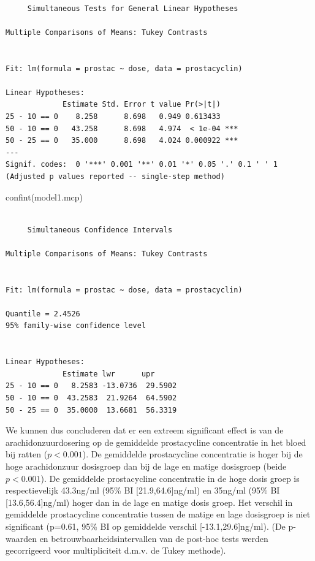 \documentclass[
  dutch,
  letterpaper,
  12pt]{book}
\newenvironment{Shaded}{\begin{snugshade}}{\end{snugshade}}
\newcommand{\FunctionTok}[1]{\textcolor[rgb]{0.28,0.35,0.67}{#1}}
\newcommand{\NormalTok}[1]{\textcolor[rgb]{0.00,0.23,0.31}{#1}}
\theoremstyle{definition}
\theoremstyle{definition}
\theoremstyle{definition}
\theoremstyle{remark}
\begin{document}
\begin{verbatim}

     Simultaneous Tests for General Linear Hypotheses

Multiple Comparisons of Means: Tukey Contrasts


Fit: lm(formula = prostac ~ dose, data = prostacyclin)

Linear Hypotheses:
             Estimate Std. Error t value Pr(>|t|)    
25 - 10 == 0    8.258      8.698   0.949 0.613433    
50 - 10 == 0   43.258      8.698   4.974  < 1e-04 ***
50 - 25 == 0   35.000      8.698   4.024 0.000922 ***
---
Signif. codes:  0 '***' 0.001 '**' 0.01 '*' 0.05 '.' 0.1 ' ' 1
(Adjusted p values reported -- single-step method)
\end{verbatim}

\begin{Shaded}
\begin{Highlighting}[]
\FunctionTok{confint}\NormalTok{(model1.mcp)}
\end{Highlighting}
\end{Shaded}

\begin{verbatim}

     Simultaneous Confidence Intervals

Multiple Comparisons of Means: Tukey Contrasts


Fit: lm(formula = prostac ~ dose, data = prostacyclin)

Quantile = 2.4526
95% family-wise confidence level
 

Linear Hypotheses:
             Estimate lwr      upr     
25 - 10 == 0   8.2583 -13.0736  29.5902
50 - 10 == 0  43.2583  21.9264  64.5902
50 - 25 == 0  35.0000  13.6681  56.3319
\end{verbatim}

We kunnen dus concluderen dat er een extreem significant effect is van
de arachidonzuurdosering op de gemiddelde prostacycline concentratie in
het bloed bij ratten (\(p<0.001\)). De gemiddelde prostacycline
concentratie is hoger bij de hoge arachidonzuur dosisgroep dan bij de
lage en matige dosisgroep (beide \(p<0.001\)). De gemiddelde
prostacycline concentratie in de hoge dosis groep is respectievelijk
43.3ng/ml (95\% BI {[}21.9,64.6{]}ng/ml) en 35ng/ml (95\% BI
{[}13.6,56.4{]}ng/ml) hoger dan in de lage en matige dosis groep. Het
verschil in gemiddelde prostacycline concentratie tussen de matige en
lage dosisgroep is niet significant (p=0.61, 95\% BI op gemiddelde
verschil {[}-13.1,29.6{]}ng/ml). (De p-waarden en
betrouwbaarheidsintervallen van de post-hoc tests werden gecorrigeerd
voor multipliciteit d.m.v. de Tukey methode).
\end{document}
